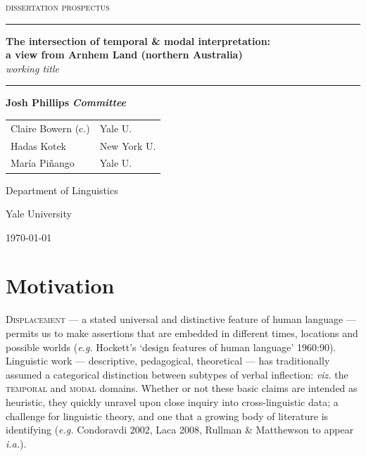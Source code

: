 \documentclass[12pt]{article}
\author{Josh}
\date{\today}
\newcommand{\HRule}{\rule{\linewidth}{0.5mm}}
\begin{document}
\begin{center}
 	\thispagestyle{empty}
 	{\Large	\textsc{dissertation prospectus}}
\vfill
\HRule\vspace{.33cm}

\setcounter{page}{-1}
\textbf{{\huge The intersection of temporal \& modal interpretation:}\\
{\Large a view from Arnhem Land (northern Australia)}}\\\textit{working title}

\HRule
\vfill
{\small \textbf{Josh Phillips}}
\vfill
\textit{\textbf{Committee}}\\
\begin{tabular}{ll}
Claire Bowern (c.) & Yale U.\\
Hadas Kotek & New York U.\\
María Piñango & Yale U.\\
\end{tabular}



\vfill
\sc Department of Linguistics
	
	Yale University
	
	\today

	
\end{center}\newpage
\thispagestyle{empty}\tableofcontents\newpage
\section{Motivation}
\lettrine{D}{isplacement} --- a stated universal and distinctive feature of human language ---  permits us to make assertions that are embedded in different times, locations and possible worlds (\textit{e.g.} Hockett's `design features of human language' 1960:90). Linguistic work --- descriptive, pedagogical, theoretical --- has traditionally assumed a categorical distinction between subtypes of verbal inflection: \textit{viz.} the \textsc{temporal} and \textsc{modal} domains. Whether or not these basic claims are intended as heuristic, they quickly unravel upon close inquiry into cross-linguistic data; a challenge for linguistic theory, and one that a growing body of literature is identifying (\textit{e.g. }Condoravdi 2002, Laca 2008, Rullman \& Matthewson to appear \textit{i.a.}).%
\end{document}
